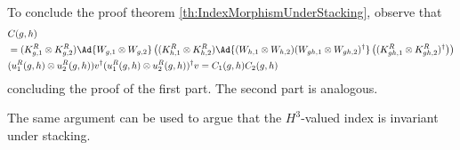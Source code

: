To conclude the proof theorem \ref{th:IndexMorphismUnderStacking}, observe that
\begin{align}
	&C(g,h)\\
	\nonumber
	&=(K_{g,1}^R\otimes K_{g,2}^R)\Ad{W_{g,1}\otimes W_{g,2}}\left((K_{h,1}^R\otimes K_{h,2}^R)\Ad{(W_{h,1}\otimes W_{h,2})(W_{gh,1}\otimes W_{gh,2})^\dagger}\left((K_{gh,1}^R\otimes K_{gh,2}^R)^\dagger\right)\right)\\
	&(u^R_1(g,h)\otimes u^R_2(g,h))v^\dagger (u^R_1(g,h)\otimes u^R_2(g,h))^\dagger v=C_1(g,h)C_2(g,h)
\end{align}
concluding the proof of the first part. The second part is analogous.
\begin{remark}\label{rem:StackingH3ValuedIndex}
	The same argument can be used to argue that the $H^3$-valued index is invariant under stacking.
\end{remark}
